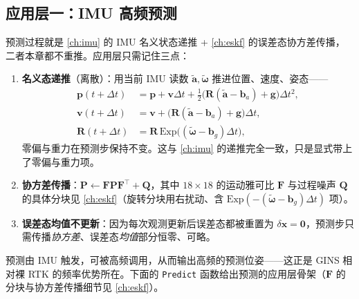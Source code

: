 \subsection{应用层一：IMU 高频预测}
\label{sec:gins-predict}

预测过程就是 \cref{ch:imu} 的 IMU 名义状态递推 + \cref{ch:eskf} 的误差态协方差传播，二者本章都不重推。应用层只需记住三点：
\begin{enumerate}
  \item \textbf{名义态递推}（离散）：用当前 IMU 读数 $\tilde{\mathbf{a}},\tilde{\boldsymbol{\omega}}$ 推进位置、速度、姿态——
  \begin{align}
  \label{eq:gins-nominal}
  \mathbf{p}(t{+}\Delta t)&=\mathbf{p}+\mathbf{v}\Delta t+\tfrac12\big(\mathbf{R}(\tilde{\mathbf{a}}-\mathbf{b}_a)+\mathbf{g}\big)\Delta t^2,\nonumber\\
  \mathbf{v}(t{+}\Delta t)&=\mathbf{v}+\big(\mathbf{R}(\tilde{\mathbf{a}}-\mathbf{b}_a)+\mathbf{g}\big)\Delta t,\\
  \mathbf{R}(t{+}\Delta t)&=\mathbf{R}\,\mathrm{Exp}\big((\tilde{\boldsymbol{\omega}}-\mathbf{b}_g)\Delta t\big),\nonumber
  \end{align}
  零偏与重力在预测步保持不变。这与 \cref{ch:imu} 的递推完全一致，只是显式带上了零偏与重力项。
  \item \textbf{协方差传播}：$\mathbf{P}\leftarrow\mathbf{F}\mathbf{P}\mathbf{F}^\top+\mathbf{Q}$，其中 $18\times 18$ 的运动雅可比 $\mathbf{F}$ 与过程噪声 $\mathbf{Q}$ 的具体分块见 \cref{ch:eskf}（旋转分块用右扰动、含 $\mathrm{Exp}(-(\tilde{\boldsymbol{\omega}}-\mathbf{b}_g)\Delta t)$ 项）。
  \item \textbf{误差态均值不更新}：因为每次观测更新后误差态都被重置为 $\delta\mathbf{x}=\mathbf{0}$，预测步只需传播\emph{协方差}、误差态\emph{均值}部分恒零、可略\cite{gao2023slamad}。
\end{enumerate}
预测由 IMU 触发，可被高频调用，从而输出高频的预测位姿——这正是 GINS 相对裸 RTK 的频率优势所在。下面的 \texttt{Predict} 函数给出预测的应用层骨架（$\mathbf{F}$ 的分块与协方差传播细节见 \cref{ch:eskf}）。

